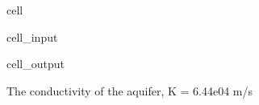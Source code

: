\documentclass[letterpaper,10pt,english]{jupyterBook}
\begin{document}
\begin{sphinxuseclass}{cell}\begin{sphinxVerbatimInput}

\begin{sphinxuseclass}{cell_input}
\begin{sphinxVerbatim}[commandchars=\\\{\}]

   

\end{sphinxVerbatim}

\end{sphinxuseclass}\end{sphinxVerbatimInput}
\begin{sphinxVerbatimOutput}

\begin{sphinxuseclass}{cell_output}
\begin{sphinxVerbatim}[commandchars=\\\{\}]
The conductivity of the aquifer, K = 6.44e\PYGZhy{}04 m/s
\end{sphinxVerbatim}

\end{sphinxuseclass}\end{sphinxVerbatimOutput}

\end{sphinxuseclass}
\end{document}
